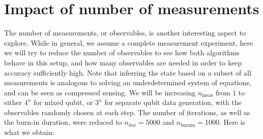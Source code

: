 \documentclass[12pt]{memoir}
\newcommand{\nitern}[1]{$n_{\text{iter}}=#1$}
\newcommand{\nburninn}[1]{$n_{\text{burnin}}=#1$}
\newcommand{\nmeas}[0]{$n_{\text{meas}} $ }
\begin{document}
\section{Impact of number of measurements}\label{section:comp-nb-meas}
The number of measurements, or observables, is another interesting aspect to explore. While in general, we assume a complete measurement experiment, here we will try to reduce the number of observables to see how both algorithms behave in this setup, and how many observables are needed in order to keep accuracy sufficiently high. Note that inferring the state based on a subset of all measurements is analogous to solving an underdetermined system of equations, and can be seen as compressed sensing. We will be increasing \nmeas from $1$ to either $4^n$ for mixed qubit, or $3^n$ for separate qubit data generation, with the observables randomly chosen at each step. The number of iterations, as well as the burn-in duration, were reduced to \nitern{5000} and \nburninn{1000}. Here is what we obtain:
\end{document}

